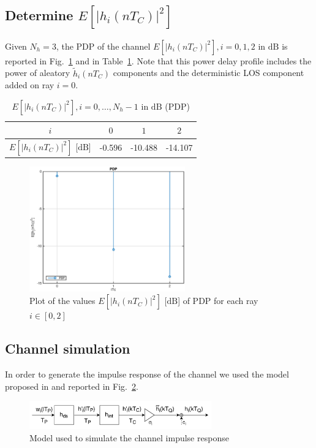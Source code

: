 \documentclass[10pt]{article}
\newcommand{\dB} {\mathrm{dB}}
\begin{document}
\subsection*{Determine $E[|h_i(nT_C)|^2]$}
Given $N_h = 3$, the PDP of the channel $E[|h_i(nT_C)|^2], i = 0, 1, 2$ in $\dB$ is reported in Fig.~\ref{fig:pdp} and in Table~\ref{table:pdp}. Note that this power delay profile includes the power of aleatory $\tilde{h}_i(nT_C)$ components and the deterministic LOS component added on ray $i = 0$.

\begin{table}[h!]
  \centering
  \begin{tabular}{c|c|c|c}
    $ i $ & $ 0 $ & $ 1 $ & $ 2 $ \\ \hline
    $E[|h_i(nT_C)|^2]$ [$\dB$] & -0.596 & -10.488 & -14.107
  \end{tabular}
  \caption{$E[|h_i(nT_C)|^2], i = 0, \dots, N_h-1$ in $\dB$ (PDP)}
  \label{table:pdp}
\end{table}

\begin{figure}[h!]
  \centering
  \includegraphics[width = 0.6\textwidth]{p01_pdp}
  \caption{Plot of the values $E[|h_i(nT_C)|^2]$ [$\dB$] of PDP for each ray $ i \in [0,2]$}
  \label{fig:pdp}
\end{figure}

\subsection*{Channel simulation}
In order to generate the impulse response of the channel we used the model proposed in \cite{bc} and reported in Fig.~\ref{fig:chimp}.
\begin{figure}[h!]
  \centering
  \includegraphics[width = 0.7\textwidth]{p01_channelmodel}
  \caption{Model used to simulate the channel impulse response}
  \label{fig:chimp}
\end{figure}
\end{document}

